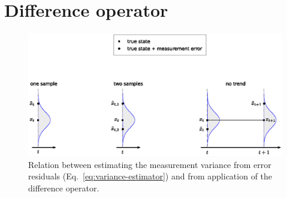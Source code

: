 
\chapter{Difference operator}
\label{ch:difference-operator}


\begin{figure}[htb]
  \centering
    \includegraphics[width=\linewidth , keepaspectratio]{./../eps/difference-operator-estimator-of-variance.eps}
  \caption{Relation between estimating the measurement variance from error residuals (Eq.~\ref{eq:variance-estimator}) and from application of the difference operator.}
  \label{fig:difference-operator-estimator-of-variance}
\end{figure}
